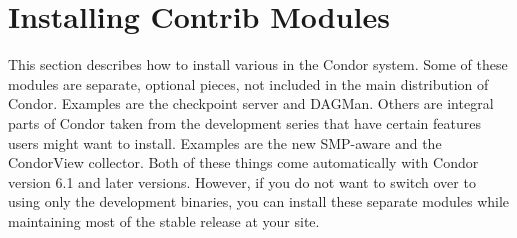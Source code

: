 \section{\label{sec:Contrib-Install}Installing Contrib Modules}

This section describes how to install various 
in the Condor system.
Some of these modules are separate, optional pieces, not included in
the main distribution of Condor.
Examples are the checkpoint server and DAGMan.
Others are integral parts of Condor taken from the development series
that have certain features users might want to install.
Examples are the new SMP-aware  and the CondorView
collector.  
Both of these things come automatically with Condor version 6.1 and
later versions.
However, if you do not want to switch over to using only the
development binaries, you can install these separate modules
while
maintaining most of the stable release at your site.










